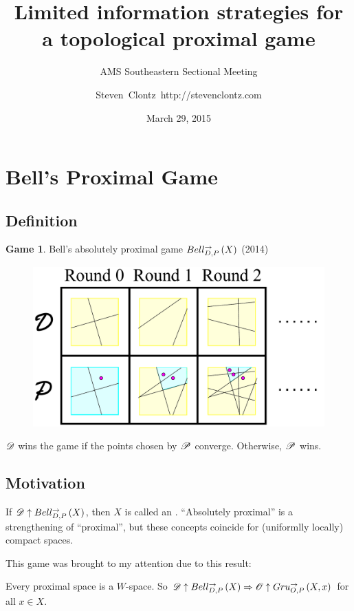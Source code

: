 \documentclass{beamer}
\title
{Limited information strategies for a topological proximal game}
\subtitle
{AMS Southeastern Sectional Meeting} %
\author%
{Steven~Clontz~http://stevenclontz.com}%
\institute[Auburn University] %
{
  Department of Mathematics and Statistics\\
  Auburn University}
\date[15-03-29] %
{March 29, 2015}
\theoremstyle{definition}
\newtheorem{game}[theorem]{Game}
\begin{document}
\newcommand{\vspacing}{\vspace{1em}}
\newcommand{\vpause}{\pause\vspacing}

\begin{frame}
  \titlepage
\end{frame}


\section{Bell's Proximal Game}

\subsection{Definition}

\begin{frame}
  \small
  \begin{game}
  Bell's absolutely proximal game $Bell_{D,P}^{\to}\left({X}\right)$ \cite{MR3239205} (2014)
    \begin{figure}
      \includegraphics[width=0.6\linewidth]{proximalGameAlt.pdf}
    \end{figure}

  $\mathscr{D}$ wins the game if the points chosen by $\mathscr{P}$ converge.
  Otherwise, $\mathscr{P}$ wins.
  \end{game}
\end{frame}

\subsection{Motivation}

\begin{frame}
  If $\mathscr{D}\uparrow Bell_{D,P}^{\to}\left({X}\right)$, then $X$ is called an
  .
  ``Absolutely proximal'' is a strengthening of ``proximal'', but these
  concepts coincide for (uniformlly locally) compact spaces.

  \vpause

  This game was brought to my attention due to this result: \cite{MR3239205}

  \begin{theorem}
    Every proximal space is a $W$-space. So
    $\mathscr{D}\uparrow Bell_{D,P}^{\to}\left({X}\right) \Rightarrow \mathscr{O}\uparrow Gru_{O,P}^{\to}\left({X},{x}\right)$
    for all $x\in X$.
  \end{theorem}
\end{frame}
\end{document}
